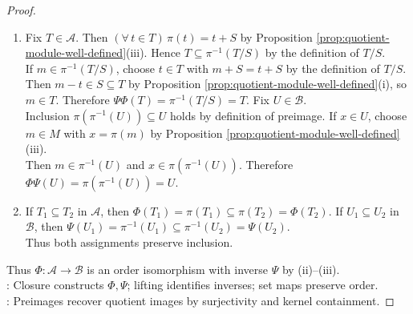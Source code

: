 \begin{theorem}
\begin{proof}
\begin{enumerate}[label=(\roman*)]
Then $\pi(ru+sv)=r\pi(u)+s\pi(v)\in U$ by Proposition \ref{prop:quotient-module-well-defined}(iii) and closure of $U$. Hence $\pi^{-1}(U)\leq M$ by Theorem \ref{thm:submodule-test}.\\
$S=\ker\pi\subseteq\pi^{-1}(U)$ by Proposition \ref{prop:quotient-module-well-defined}(iii) and $0_{M/S}\in U$. Hence $\Psi(U)=\pi^{-1}(U)\in\mathcal{A}$ by the definition of $\mathcal{A}$.
\item Fix $T\in\mathcal{A}$. Then $(\forall\,t\in T)\,\pi(t)=t+S$ by Proposition \ref{prop:quotient-module-well-defined}(iii). Hence $T\subseteq\pi^{-1}(T/S)$ by the definition of $T/S$.\\
If $m\in\pi^{-1}(T/S)$, choose $t\in T$ with $m+S=t+S$ by the definition of $T/S$.\\
Then $m-t\in S\subseteq T$ by Proposition \ref{prop:quotient-module-well-defined}(i), so $m\in T$. Therefore $\Psi\Phi(T)=\pi^{-1}(T/S)=T$. Fix $U\in\mathcal{B}$.\\
Inclusion $\pi(\pi^{-1}(U))\subseteq U$ holds by definition of preimage. If $x\in U$, choose $m\in M$ with $x=\pi(m)$ by Proposition \ref{prop:quotient-module-well-defined}(iii).\\
Then $m\in\pi^{-1}(U)$ and $x\in\pi(\pi^{-1}(U))$. Therefore $\Phi\Psi(U)=\pi(\pi^{-1}(U))=U$.
\item If $T_1\subseteq T_2$ in $\mathcal{A}$, then $\Phi(T_1)=\pi(T_1)\subseteq\pi(T_2)=\Phi(T_2)$. If $U_1\subseteq U_2$ in $\mathcal{B}$, then $\Psi(U_1)=\pi^{-1}(U_1)\subseteq\pi^{-1}(U_2)=\Psi(U_2)$.\\
Thus both assignments preserve inclusion.
\end{enumerate}
Thus $\Phi:\mathcal{A}\to\mathcal{B}$ is an order isomorphism with inverse $\Psi$ by (ii)--(iii).\\
: Closure constructs $\Phi,\Psi$; lifting identifies inverses; set maps preserve order.\\
: Preimages recover quotient images by surjectivity and kernel containment.
\end{proof}
\end{theorem}

